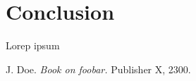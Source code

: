 \documentclass{ctuthesis}
\begin{document}
\maketitle



\chapter{Conclusion}

Lorep ipsum \cite{doe}

\begin{thebibliography}{1}

     J. Doe. \emph{Book on foobar.} Publisher X, 2300.

\end{thebibliography}
\end{document}
